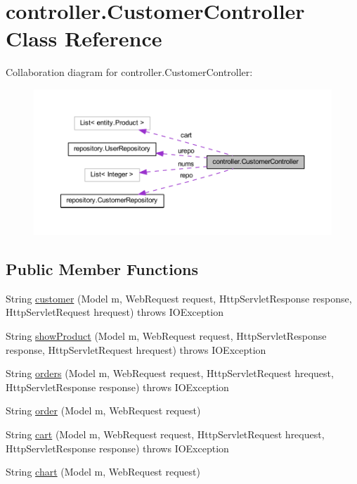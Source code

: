 \hypertarget{classcontroller_1_1_customer_controller}{}\section{controller.\+Customer\+Controller Class Reference}
\label{classcontroller_1_1_customer_controller}


Collaboration diagram for controller.\+Customer\+Controller\+:\nopagebreak
\begin{figure}[H]
\begin{center}
\leavevmode
\includegraphics[width=350pt]{classcontroller_1_1_customer_controller__coll__graph}
\end{center}
\end{figure}
\subsection*{Public Member Functions}
\begin{DoxyCompactItemize}
\item 
String \mbox{\hyperlink{classcontroller_1_1_customer_controller_a5496f4bf5f03f585ee223c0192d4fc85}{customer}} (Model m, Web\+Request request, Http\+Servlet\+Response response, Http\+Servlet\+Request hrequest)  throws I\+O\+Exception 
\item 
String \mbox{\hyperlink{classcontroller_1_1_customer_controller_a9c7aebe2a5ae4e7419fd10121a6a7189}{show\+Product}} (Model m, Web\+Request request, Http\+Servlet\+Response response, Http\+Servlet\+Request hrequest)  throws I\+O\+Exception 
\item 
String \mbox{\hyperlink{classcontroller_1_1_customer_controller_af47f965b533083f4415c63f1065cbd64}{orders}} (Model m, Web\+Request request, Http\+Servlet\+Request hrequest, Http\+Servlet\+Response response)  throws I\+O\+Exception 
\item 
String \mbox{\hyperlink{classcontroller_1_1_customer_controller_a74ff447f25dce313f84a08cf5356f8e8}{order}} (Model m, Web\+Request request)
\item 
String \mbox{\hyperlink{classcontroller_1_1_customer_controller_a90aa906ff9e90be62b82941992350235}{cart}} (Model m, Web\+Request request, Http\+Servlet\+Request hrequest, Http\+Servlet\+Response response)  throws I\+O\+Exception 
\item 
String \mbox{\hyperlink{classcontroller_1_1_customer_controller_add866b64d6e08876db8b97087eaeb389}{chart}} (Model m, Web\+Request request)
\end{DoxyCompactItemize}


